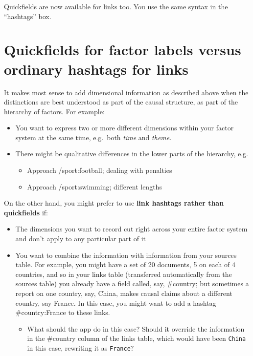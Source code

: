 \documentclass[
]{book}
\providecommand{\tightlist}{%
  \setlength{\itemsep}{0pt}\setlength{\parskip}{0pt}}
\begin{document}
Quickfields are now available for links too. You use the same syntax in the ``hashtags'' box.

\hypertarget{quickfields-for-factor-labels-versus-ordinary-hashtags-for-links}{%
\section{Quickfields for factor labels versus ordinary hashtags for links}\label{quickfields-for-factor-labels-versus-ordinary-hashtags-for-links}}

It makes most sense to add dimensional information as described above when the distinctions are best understood as part of the causal structure, as part of the hierarchy of factors. For example:

\begin{itemize}
\tightlist
\item
  You want to express two or more different dimensions within your factor system at the same time, e.g.~both \emph{time} and \emph{theme}.
\item
  There might be qualitative differences in the lower parts of the hierarchy, e.g.

  \begin{itemize}
  \tightlist
  \item
    Approach /sport:football; dealing with penalties
  \item
    Approach /sport:swimming; different lengths
  \end{itemize}
\end{itemize}

On the other hand, you might prefer to use \textbf{link hashtags rather than quickfields} if:

\begin{itemize}
\tightlist
\item
  The dimensions you want to record cut right across your entire factor system and don't apply to any particular part of it
\item
  You want to combine the information with information from your sources table. For example, you might have a set of 20 documents, 5 on each of 4 countries, and so in your links table (transferred automatically from the sources table) you already have a field called, say, \#country; but sometimes a report on one country, say, China, makes causal claims about a different country, say France. In this case, you might want to add a hashtag \#country:France to these links.

  \begin{itemize}
  \tightlist
  \item
    What should the app do in this case? Should it override the information in the \#country column of the links table, which would have been \texttt{China} in this case, rewriting it as \texttt{France}?
  \end{itemize}
\end{itemize}
\end{document}
